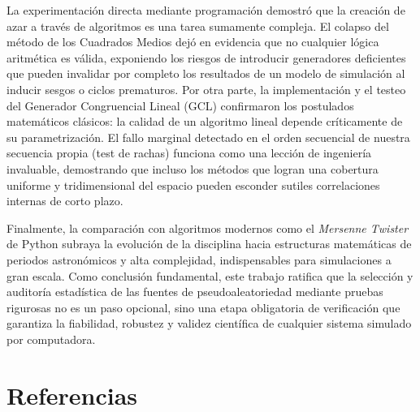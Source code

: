 \documentclass{article}
\begin{document}
La experimentación directa mediante programación demostró que la creación de azar a través de algoritmos es una tarea sumamente compleja. El colapso del método de los Cuadrados Medios dejó en evidencia que no cualquier lógica aritmética es válida, exponiendo los riesgos de introducir generadores deficientes que pueden invalidar por completo los resultados de un modelo de simulación al inducir sesgos o ciclos prematuros. Por otra parte, la implementación y el testeo del Generador Congruencial Lineal (GCL) confirmaron los postulados matemáticos clásicos: la calidad de un algoritmo lineal depende críticamente de su parametrización. El fallo marginal detectado en el orden secuencial de nuestra secuencia propia (test de rachas) funciona como una lección de ingeniería invaluable, demostrando que incluso los métodos que logran una cobertura uniforme y tridimensional del espacio pueden esconder sutiles correlaciones internas de corto plazo.

Finalmente, la comparación con algoritmos modernos como el \textit{Mersenne Twister} de Python subraya la evolución de la disciplina hacia estructuras matemáticas de periodos astronómicos y alta complejidad, indispensables para simulaciones a gran escala. Como conclusión fundamental, este trabajo ratifica que la selección y auditoría estadística de las fuentes de pseudoaleatoriedad mediante pruebas rigurosas no es un paso opcional, sino una etapa obligatoria de verificación que garantiza la fiabilidad, robustez y validez científica de cualquier sistema simulado por computadora.

\newpage

\section{Referencias}
\end{document}
